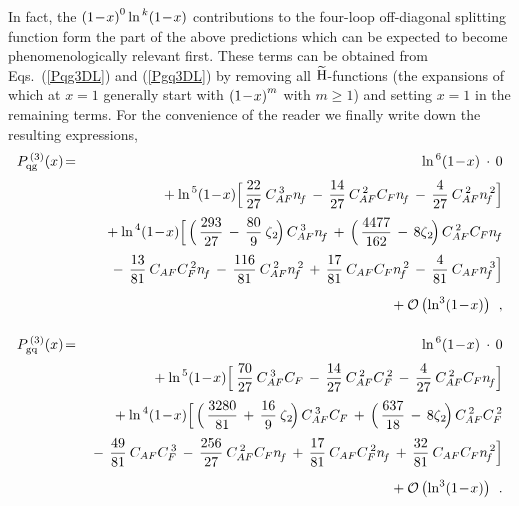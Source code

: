 \documentclass[12pt]{article}
\newcommand{\hspn}{{\hspace{-4mm}}}
\newcommand{\bea}{\begin{eqnarray}}
\newcommand{\eea}{\end{eqnarray}}
\newcommand{\nn}{\nonumber}
\begin{document}
In fact, the $\x1^{0} \ln^{\,k}\! \x1$ contributions to the four-loop 
off-diagonal splitting function form the part of the above predictions which 
can be expected to become phenomenologically relevant first. These terms can
be obtained from Eqs.~(\ref{Pqg3DL}) and (\ref{Pgq3DL}) by removing all
$\widetilde{\rm H}$-functions (the expansions of which at $x=1$ generally start
with $\x1^m$ with $m \geq 1$) and setting $x=1$ in the remaining terms. For
the convenience of the reader we finally write down the resulting expressions,
%
\bea
\label{Pqg3DL0}
%
  P_{\rm qg}^{\,(3)}(x) &\! = \!&
%
     \ln^{\,6}\! \x1 \: \cdot \, 0
\nn \\[1mm] & & \mbox{\hspn}
     + \ln^{\,5}\! \x1 \* \Big[\,
            {22 \over 27}\: \* \caft \* \nf
          \,- \, {14 \over 27}\: \* \cafs \* \cf \* \nf
          \,- \, {4 \over 27}\: \* \cafs \* \nfs
          \Big]
\nn \\[1mm] & & \mbox{\hspn}
     + \ln^{\,4}\! \x1 \* \Big[\,
            \Big( \, {293 \over 27}
            \,-\, {80 \over 9}\: \* \z2\! \Big)\, \* \caft \* \nf
          \,+\, \Big( \, {4477 \over 162}
          \,-\, 8 \* \z2\! \Big)\, \* \cafs \* \cf \* \nf
\nn \\[1mm] & & \mbox{}
          \,-\, {13 \over 81}\: \* \caf \* \cfs \* \nf
          \,-\, {116 \over 81}\: \* \cafs \* \nfs
          \,+\, {17 \over 81}\: \* \caf \* \cf \* \nfs
          \,-\, {4 \over 81}\: \* \caf \* \nft
          \Big]
\nn \\[2mm] & & \mbox{\hspn}
      + {\cal O} \left( \ln^3 \! \x1 \right)
%
\:\: , \\[4mm] 
\label{Pgq3DL0}
%
  P_{\rm gq}^{\,(3)}(x) &\! = \!&
%
     \ln^{\,6}\! \x1 \: \cdot \, 0
\nn \\[1mm] & & \mbox{\hspn}
     + \ln^{\,5}\! \x1 \* \Big [ \:
            {70 \over 27}\: \* \caft \* \cf
          \,-\, {14 \over 27}\: \* \cafs \* \cfs 
          \,-\, {4 \over 27}\: \* \cafs \* \cf \* \nf
          \Big]
\nn \\[1mm] & & \mbox{\hspn}
     + \ln^{\,4}\! \x1 \* \Big [ \,
            \Big( \, {3280 \over 81}
            \,+\, {16 \over 9}\: \* \z2\! \Big)\, \* \caft \* \cf
          \,+\, \Big( \, {637 \over 18}
          \,-\, 8 \* \z2\! \Big)\, \* \cafs \* \cfs 
\nn \\[1mm] & & \mbox{}
          \,-\, {49 \over 81}\: \* \caf \* \cft 
          \,-\, {256 \over 27}\: \* \cafs \* \cf \* \nf
          \,+\, {17 \over 81}\: \* \caf \* \cfs \* \nf
          \,+\, {32 \over 81}\: \* \caf \* \cf \* \nfs
          \Big]
\nn \\[2mm] & & \mbox{\hspn}
      + {\cal O} \left( \ln^3 \! \x1 \right)
 \:\: .
\eea
 
\end{document}

